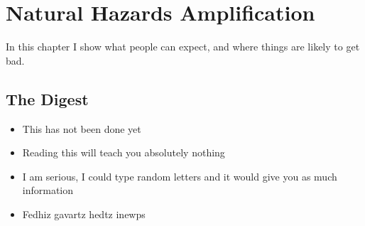 \setchapterpreamble[u]{\margintoc}
\chapter{Natural Hazards Amplification}

In this chapter I show what people can expect, and where things are likely to get bad. 


\blindtext


\section{The Digest}


\begin{kaoboxgreen}[frametitle=Main Takeaways]

\begin{itemize}
\item This has not been done yet
\item Reading this will teach you absolutely nothing
\item I am serious, I could type random letters and it would give you as much information
\item Fedhiz gavartz hedtz inewps
\end{itemize}
  
\end{kaoboxgreen}